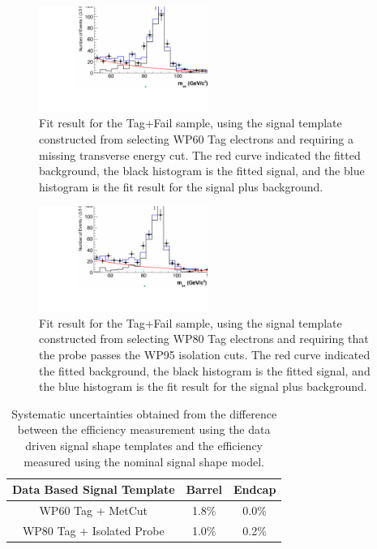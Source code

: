 \begin{figure}[htb]
  \begin{center}
    \includegraphics[width=0.49\textwidth]{Efficiency_RecoToVBTF80_Fail_Systematics_Tag60MetCut.pdf}     
    \caption{Fit result for the Tag+Fail sample, using the signal template constructed from selecting WP60 Tag electrons and requiring a missing transverse energy cut. The red curve indicated the fitted background, the black histogram is the fitted signal, and the blue histogram is the fit result for the signal plus background. }
    \label{fig:Efficiency_RecoToVBTF80_Fail_Systematics_Tag60MetCut}
  \end{center}
\end{figure}

\begin{figure}[htb]
  \begin{center}
    \includegraphics[width=0.49\textwidth]{Efficiency_RecoToVBTF80_Fail_Systematics_Tag80IsoProbe.pdf}     
    \caption{Fit result for the Tag+Fail sample, using the signal template constructed from selecting WP80 Tag electrons and requiring that the probe passes the WP95 isolation cuts. The red curve indicated the fitted background, the black histogram is the fitted signal, and the blue histogram is the fit result for the signal plus background.}
    \label{fig:Efficiency_RecoToVBTF80_Fail_Systematics_Tag80IsoProbe}
  \end{center}
\end{figure}

\begin{table}[!ht]
\begin{center}
\begin{tabular}{c|c|c} \hline \hline
 Data Based Signal Template   &  Barrel  & Endcap  \\ \hline
 WP60 Tag + MetCut            &  1.8\%   & 0.0\%   \\ 
 WP80 Tag + Isolated Probe    &  1.0\%   & 0.2\%   \\ \hline
\end{tabular}
\caption{Systematic uncertainties obtained from the difference between the efficiency measurement using the data driven signal shape templates and the efficiency measured using the nominal signal shape model.\label{tab:SignalShapeSystematics}}
\end{center}
\end{table}


